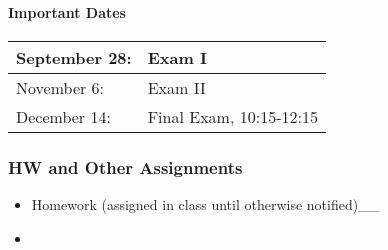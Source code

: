 \documentclass[letterpaper,10pt,english]{sphinxmanual}
\begin{document}
\paragraph{Important Dates}
\label{\detokenize{classes/ME7690Syll:important-dates}}

\begin{savenotes}\sphinxattablestart
\centering
\begin{tabulary}{\linewidth}[t]{|T|T|}
\hline

September 28:
&
Exam I
\\
\hline
November 6:
&
Exam II
\\
\hline
December 14:
&
Final Exam, 10:15-12:15
\\
\hline
\end{tabulary}
\par
\sphinxattableend\end{savenotes}


\subsubsection{HW and Other Assignments}
\label{\detokenize{classes/vibrationtesting:vibration-testing-toolbox-for-matlab}}\label{\detokenize{classes/vibrationtesting:hw-and-other-assignments}}\begin{itemize}
\item {} 
Homework (assigned in class until otherwise notified)\_\_

\item {} 

\end{itemize}
\end{document}
